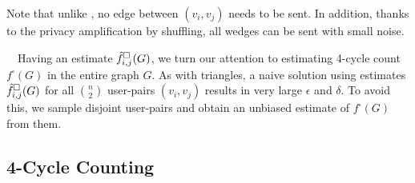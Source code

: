 Note that unlike \AlgWSLE{}, no edge between $(v_i,v_j)$ needs to be sent. 
In addition, thanks to the privacy amplification by shuffling, all wedges can be sent with 
small noise.

\smallskip
~~Having an estimate $\hat{f}_{i,j}^\square(G)$, we turn our attention to estimating 4-cycle count $f^\square(G)$ in the entire graph $G$.
As with triangles, a naive solution using estimates $\hat{f}_{i,j}^\square(G)$ for all $\binom{n}{2}$ user-pairs $(v_i,v_j)$ results in very large $\epsilon$ and $\delta$. 
To avoid this, we sample disjoint user-pairs and obtain an unbiased estimate of $f^\square(G)$ from them. 

\subsection{4-Cycle Counting}
\label{sub:4cycle_details}

